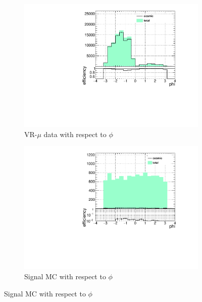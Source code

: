 \begin{figure}[h]
  \ContinuedFloat
  \centering
  \begin{subfigure}[b]{0.4\textwidth}
  	\includegraphics[width=\textwidth]{figures/cosmics/wider_tag_ratio_phi.pdf}
  	\caption{VR-$\mu$ data with respect to $\phi$}
  \end{subfigure}
  \begin{subfigure}[b]{0.4\textwidth}
 	\includegraphics[width=\textwidth]{figures/cosmics/mc_300_ratio_phi.pdf}
  	\caption{Signal \ac{MC} with respect to $\phi$}
  \end{subfigure}


\end{figure}
